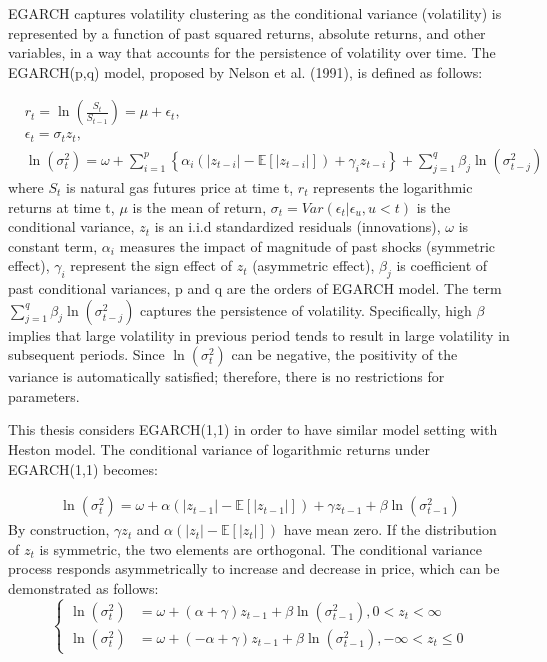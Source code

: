 \documentclass[12pt,a4paper]{article}
\numberwithin{equation}{section}
\begin{document}
EGARCH captures volatility clustering as the conditional variance (volatility) is represented by a function of past squared returns, absolute returns, and other variables, in a way that accounts for the persistence of volatility over time. The EGARCH(p,q) model, proposed by Nelson et al. (1991), is defined as follows:

 \begin{align*}
 &r_t = \ln \left(\frac{S_t}{S_{t-1}}\right) = \mu + \epsilon_t ,\\
 &\epsilon_t = \sigma_t z_t,\\
 &\ln\left(\sigma_t^2\right) = \omega + \sum_{i=1}^p \left\{ \alpha_i \left( |z_{t-i}| - \mathbb{E}[|z_{t-i}|] \right) + \gamma_i z_{t-i} \right\} + \sum_{j=1}^q \beta_j \ln\left(\sigma_{t-j}^2\right)
 \end{align*}
 where $S_t$ is natural gas futures price at time t,  $r_t$ represents the logarithmic returns at time t, $\mu$ is the mean of return, $\sigma_t = Var(\epsilon_t|\epsilon_u, u<t)$ is the conditional variance, $z_t$ is an i.i.d standardized residuals (innovations), $\omega$ is constant term, $\alpha_i$ measures the impact of magnitude of past shocks (symmetric effect), $\gamma_i$ represent the sign effect of $z_t$ (asymmetric effect), $\beta_j$ is coefficient of past conditional variances, p and q are the orders of EGARCH model. The term $\sum_{j=1}^q \beta_j \ln\left(\sigma_{t-j}^2\right)$ captures the persistence of volatility. Specifically, high $\beta$ implies that large volatility in previous period tends to result in large volatility in subsequent periods. Since $\ln(\sigma_t^2)$ can be negative, the positivity of the variance is automatically satisfied; therefore, there is no restrictions for parameters.
 
 This thesis considers EGARCH(1,1) in order to have similar model setting with Heston model. The conditional variance of logarithmic returns under EGARCH(1,1) becomes:
 
  \begin{align*}
  \ln\left(\sigma_t^2\right) = \omega + \alpha \left( |z_{t-1}| - \mathbb{E}[|z_{t-1}|] \right) + \gamma z_{t-1} +  \beta \ln\left(\sigma_{t-1}^2\right)
 \end{align*}
By construction, $\gamma z_t$ and $\alpha (|z_t| - \mathbb{E}[|z_t|])$ have mean zero. If the distribution of $z_t$ is symmetric, the two elements are orthogonal. The conditional variance process responds asymmetrically to increase and decrease in price, which can be demonstrated as follows: 
 \begin{equation}
 \begin{cases}
 \ln\left(\sigma_t^2\right) &= \omega + (\alpha + \gamma) z_{t-1} +  \beta \ln\left(\sigma_{t-1}^2\right), 0 < z_t < \infty \\
 \ln\left(\sigma_t^2\right) &= \omega + (-\alpha + \gamma) z_{t-1} +  \beta \ln\left(\sigma_{t-1}^2\right), -\infty < z_t \le 0
 \end{cases}
 \end{equation}
\end{document}
